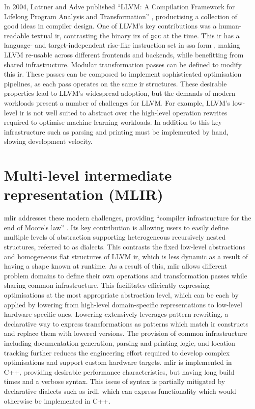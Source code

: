 In 2004, Lattner and Adve published ``LLVM: A Compilation Framework for
Lifelong Program Analysis and Transformation'' \cite{lattnerLLVMCompilationFramework2004}, productising a collection of good ideas in compiler design.
One of LLVM's key contributions was a human-readable textual \ac{ir}, contrasting the binary \acp{ir} of \texttt{gcc} at the time. This \ac{ir} has a language- and target-independent \acs{risc}-like instruction set in \ac{ssa} form \cite{cytronEfficientlyComputingStatic1991}, making LLVM re-usable across different frontends and backends, while benefitting from shared infrastructure. Modular transformation passes can be defined to modify this \ac{ir}. These passes can be composed to implement sophisticated optimisation pipelines, as each pass operates on the same \ac{ir} structures.
These desirable properties lead to LLVM's widespread adoption, but the demands of modern workloads present a number of challenges for LLVM.
For example, LLVM's low-level \ac{ir} is not well suited to abstract over the high-level operation rewrites required to optimise machine learning workloads. In addition to this key infrastructure such as parsing and printing must be implemented by hand, slowing development velocity.

\section{Multi-level intermediate representation (MLIR)}
\label{sec:mlir}

\acf{mlir} addresses these modern challenges, providing ``compiler infrastructure for the end of Moore's law'' \cite{lattnerMLIRScalingCompiler2021a}.
Its key contribution is allowing users to easily define multiple levels of abstraction supporting heterogeneous recursively nested structures, referred to as dialects. This contrasts the fixed low-level abstractions and homogeneous flat structures of LLVM \ac{ir}, which is less dynamic as a result of having a shape known at runtime. As a result of this, \ac{mlir} allows different problem domains to define their own operations and transformation passes while sharing common infrastructure. This facilitates efficiently expressing optimisations at the most appropriate abstraction level, which can be each by applied by lowering from high-level domain-specific representations to low-level hardware-specific ones. Lowering extensively leverages pattern rewriting, a declarative way to express transformations as patterns which match \ac{ir} constructs and replace them with lowered versions.
The provision of common infrastructure including documentation generation, parsing and printing logic, and location tracking further reduces the engineering effort required to develop complex optimisations and support custom hardware targets.
\ac{mlir} is implemented in C++, providing desirable performance characteristics, but having long build times and a verbose syntax.
This issue of syntax is partially mitigated by declarative dialects such as \acs{irdl}, which can express functionality which would otherwise be implemented in C++.

